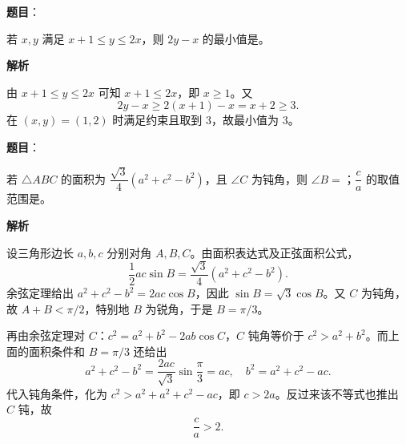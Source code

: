 \begin{answer}

\textbf{题目}：

若 $x,y$ 满足 $x+1\le y\le2x$，则 $2y-x$ 的最小值是\gkblank{}。

\textbf{解析}

由 $x+1\le y\le2x$ 可知 $x+1\le2x$，即 $x\ge1$。又
\nopagebreak[4]
\[
2y-x\ge2(x+1)-x=x+2\ge3.
\]
在 $(x,y)=(1,2)$ 时满足约束且取到 $3$，故最小值为 $3$。


\end{answer}
\begin{answer}

\textbf{题目}：

若 $\triangle ABC$ 的面积为 $\dfrac{\sqrt3}{4}(a^2+c^2-b^2)$，且 $\angle C$ 为钝角，则 $\angle B=$\gkblank{}；$\dfrac ca$ 的取值范围是\gkblank{}。

\textbf{解析}

设三角形边长 $a,b,c$ 分别对角 $A,B,C$。由面积表达式及正弦面积公式，
\nopagebreak[4]
\[
\frac12ac\sin B=\frac{\sqrt3}{4}(a^2+c^2-b^2).
\]
余弦定理给出 $a^2+c^2-b^2=2ac\cos B$，因此 $\sin B=\sqrt3\cos B$。又 $C$ 为钝角，故 $A+B<\pi/2$，特别地 $B$ 为锐角，于是 $B=\pi/3$。

再由余弦定理对 $C$：$c^2=a^2+b^2-2ab\cos C$，$C$ 钝角等价于 $c^2>a^2+b^2$。而上面的面积条件和 $B=\pi/3$ 还给出
\nopagebreak[4]
\[
a^2+c^2-b^2=\frac{2ac}{\sqrt3}\sin\frac\pi3=ac,
\quad b^2=a^2+c^2-ac.
\]
代入钝角条件，化为 $c^2>a^2+a^2+c^2-ac$，即 $c>2a$。反过来该不等式也推出 $C$ 钝，故
\nopagebreak[4]
\[
\frac ca>2.
\]


\end{answer}

